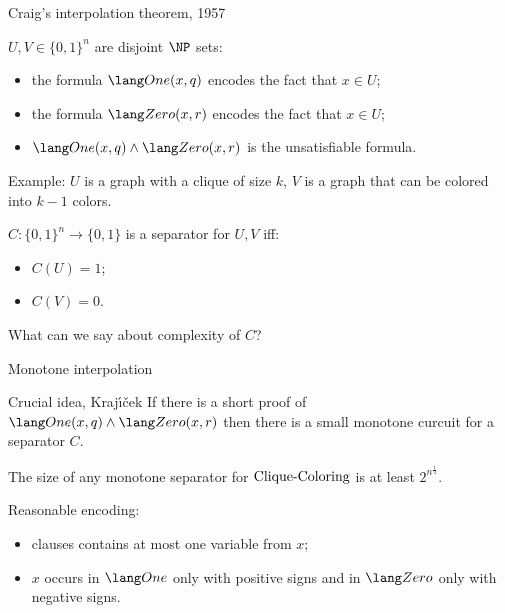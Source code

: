 \begin{frame}{Craig's interpolation theorem, 1957}

    $U, V \in \{0, 1\}^n$ are disjoint $\NP$ sets:
    \begin{itemize}
        \item the formula $\One(x, q)$ encodes the fact that $x \in U$;
        \item the formula $\Zero(x, r)$ encodes the fact that $x \in U$;
        \item $\One(x, q) \land \Zero(x, r)$ is the unsatisfiable formula.
            
    \end{itemize}

    \vspace{0.2cm}
    \pause
    Example: $U$ is a graph with a clique of size $k$, $V$ is a graph that can be colored into $k - 1$
    colors.

    \pause
    \begin{definition}
	    $C: \{0, 1\}^n \to \{0, 1\}$ is a separator for $U, V$ iff:
        \begin{itemize}
            \item $C(U) = 1$;
            \item $C(V) = 0$.
        \end{itemize}        
    \end{definition}

    \pause
	What can we say about complexity of $C$?

\end{frame}


\begin{frame}{Monotone interpolation}

    \begin{block}{Crucial idea, Kraj{\'{\i}}{\v{c}}ek}
        If there is a short proof of $\One(x, q) \land \Zero(x, r)$ then there is a small
        \alert{monotone} {\color{blue} curcuit} for a separator $C$.
    \end{block}

    \begin{theorem}
        The size of any monotone separator for $\mathrm{Clique}\text{-}\mathrm{Coloring}$ is at least $2^{n^{\frac{1}{4}}}$.
    \end{theorem}

    \pause
    Reasonable encoding:
    \begin{itemize}
        \item clauses contains at most one variable from $x$;
        \item $x$ occurs in $\One$ only with positive signs and in $\Zero$ only with negative signs.
    \end{itemize}
\end{frame}

